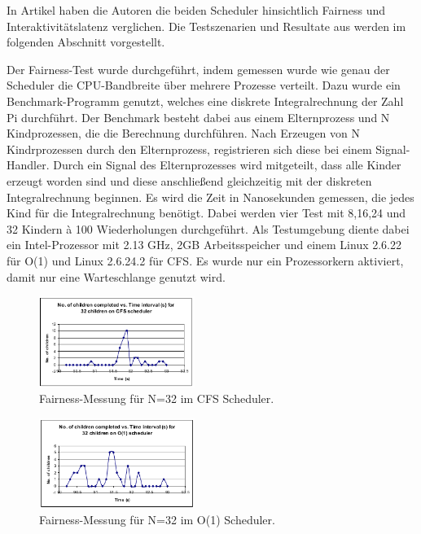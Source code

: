 In Artikel \cite{papercomparison} haben die Autoren die beiden Scheduler hinsichtlich Fairness und Interaktivitätslatenz verglichen. Die Testszenarien und  Resultate aus \cite{papercomparison} werden im folgenden Abschnitt vorgestellt.

Der Fairness-Test wurde durchgeführt, indem gemessen wurde wie genau der Scheduler die CPU-Bandbreite über mehrere Prozesse verteilt. Dazu wurde ein Benchmark-Programm genutzt, welches eine diskrete Integralrechnung der Zahl Pi durchführt. Der Benchmark besteht dabei aus einem Elternprozess und N Kindprozessen, die die Berechnung durchführen. Nach Erzeugen von N Kindrprozessen durch den Elternprozess, registrieren sich diese bei einem Signal-Handler. Durch ein Signal des Elternprozesses wird mitgeteilt, dass alle Kinder erzeugt worden sind und diese anschließend gleichzeitig mit der diskreten Integralrechnung beginnen. Es wird die Zeit in Nanosekunden gemessen, die jedes Kind für die Integralrechnung benötigt. Dabei werden vier Test mit 8,16,24 und 32 Kindern à 100 Wiederholungen durchgeführt. Als Testumgebung diente dabei ein Intel-Prozessor mit 2.13 GHz, 2GB Arbeitsspeicher und einem Linux 2.6.22 für O(1) und Linux 2.6.24.2 für CFS. Es wurde nur ein Prozessorkern aktiviert, damit nur eine Warteschlange genutzt wird.  
\begin{figure} [h]
	\centering
	\includegraphics[width=0.45\textwidth]{pictures/fairness_32_cfs.png}
	\caption{Fairness-Messung für N=32 im CFS Scheduler.}
	\label{fig:fair_meas_cfs}
\end{figure}
\begin{figure} [h]
 	\centering
 	\includegraphics[width=0.45\textwidth]{pictures/fairness_32_O1.png}
 	\caption{Fairness-Messung für N=32 im O(1) Scheduler.}
 	\label{fig:fair_meas_o1}
\end{figure}

